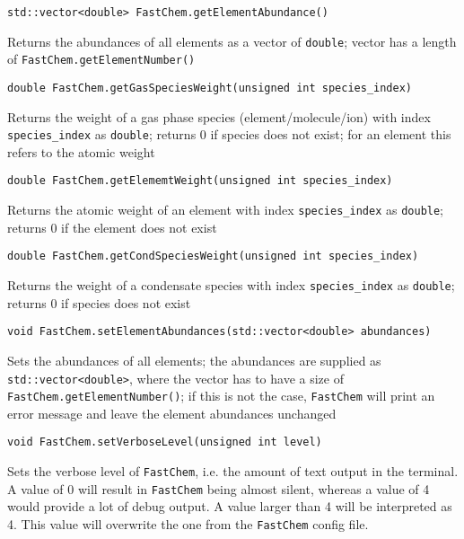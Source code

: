 \documentclass[numbers=noenddot]{aux/fcmanual}
\newcommand{\fc}{\texttt{FastChem}\xspace}
\begin{document}
\bigbreak

\lstinline!std::vector<double> FastChem.getElementAbundance()!
\begin{addmargin}[25pt]{0pt}
  Returns the abundances of all elements as a vector of \lstinline!double!; vector has a length of \lstinline!FastChem.getElementNumber()!
\end{addmargin}


\bigbreak

\lstinline!double FastChem.getGasSpeciesWeight(unsigned int species_index)!
\begin{addmargin}[25pt]{0pt}
  Returns the weight of a gas phase species (element/molecule/ion) with index \lstinline!species_index! as \lstinline!double!; returns 0 if species does not exist; for an element this refers to the atomic weight
\end{addmargin}

\bigbreak

\lstinline!double FastChem.getElememtWeight(unsigned int species_index)!
\begin{addmargin}[25pt]{0pt}
	Returns the atomic weight of an element with index \lstinline!species_index! as \lstinline!double!; returns 0 if the element does not exist
\end{addmargin}

\bigbreak

\lstinline!double FastChem.getCondSpeciesWeight(unsigned int species_index)!
\begin{addmargin}[25pt]{0pt}
	Returns the weight of a condensate species with index \lstinline!species_index! as \lstinline!double!; returns 0 if species does not exist
\end{addmargin}


\bigbreak

\lstinline!void FastChem.setElementAbundances(std::vector<double> abundances)!
\begin{addmargin}[25pt]{0pt}
  Sets the abundances of all elements; the abundances are supplied as \lstinline!std::vector<double>!, where the vector has to have a size of \lstinline!FastChem.getElementNumber()!; if this is not the case, \fc will print an error message and leave the element abundances unchanged
\end{addmargin}

\bigbreak

\lstinline!void FastChem.setVerboseLevel(unsigned int level)!
\begin{addmargin}[25pt]{0pt}
  Sets the verbose level of \fc, i.e. the amount of text output in the terminal. A value of 0 will result in \fc being almost silent, whereas a value of 4 would provide a lot of debug output. A value larger than 4 will be interpreted as 4. This value will overwrite the one from the \fc config file.
\end{addmargin}
\end{document}
